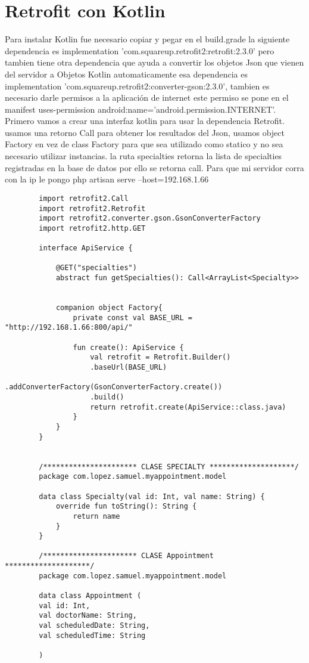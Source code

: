 \documentclass[a4paper]{article}
\begin{document}
	
	\section{Retrofit con Kotlin}
	
	Para instalar Kotlin fue necesario copiar y pegar en el build.grade la siguiente dependencia es implementation 'com.squareup.retrofit2:retrofit:2.3.0' pero tambien tiene otra dependencia que ayuda a convertir los objetos Json que vienen del servidor a Objetos Kotlin automaticamente esa dependencia es implementation 'com.squareup.retrofit2:converter-gson:2.3.0', tambien es necesario darle permisos a la aplicación de internet este permiso se pone en el manifest uses-permission android:name='android.permission.INTERNET'. 
	Primero vamos a crear una interfaz kotlin para usar la dependencia Retrofit. usamos una retorno Call para obtener los resultados del Json, usamos object Factory en vez de class Factory para que sea utilizado como statico y no sea necesario utilizar instancias. la ruta specialties retorna la lista de specialties registradas en la base de datos por ello se retorna call. Para que mi servidor corra con la ip le pongo php artisan serve --host=192.168.1.66
	
	\lstset{style=mystyle,caption=Interfaz ApiService,label=DescriptiveLabel}
	\begin{lstlisting}
		import retrofit2.Call
		import retrofit2.Retrofit
		import retrofit2.converter.gson.GsonConverterFactory
		import retrofit2.http.GET
		
		interface ApiService {
			
			@GET("specialties")
			abstract fun getSpecialties(): Call<ArrayList<Specialty>>
			
			
			companion object Factory{
				private const val BASE_URL = "http://192.168.1.66:800/api/"
				
				fun create(): ApiService {
					val retrofit = Retrofit.Builder()
					.baseUrl(BASE_URL)
					.addConverterFactory(GsonConverterFactory.create())
					.build()
					return retrofit.create(ApiService::class.java)
				}
			}
		}
	
	
		/********************** CLASE SPECIALTY ********************/
		package com.lopez.samuel.myappointment.model
		
		data class Specialty(val id: Int, val name: String)	{
			override fun toString(): String {
				return name 
			}
		}
		
		/********************** CLASE Appointment ********************/
		package com.lopez.samuel.myappointment.model
		
		data class Appointment (
		val id: Int,
		val doctorName: String,
		val scheduledDate: String,
		val scheduledTime: String
		
		)
	\end{lstlisting}
	
\end{document}
